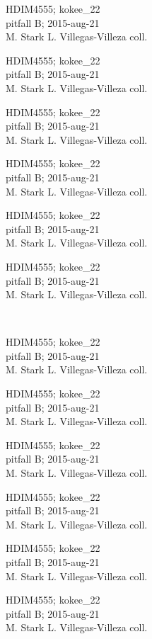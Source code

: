 \documentclass[2pt]{extarticle}
\begin{document}
\noindent
\parbox{0.16\textwidth}{\tiny \raggedright \rule[-0.3\baselineskip]{0pt}{10pt}HDIM4555; kokee\_22\\ pitfall B; 2015-aug-21\\ M. Stark L. Villegas-Villeza coll.}
\parbox{0.16\textwidth}{\tiny \raggedright \rule[-0.3\baselineskip]{0pt}{10pt}HDIM4555; kokee\_22\\ pitfall B; 2015-aug-21\\ M. Stark L. Villegas-Villeza coll.}
\parbox{0.16\textwidth}{\tiny \raggedright \rule[-0.3\baselineskip]{0pt}{10pt}HDIM4555; kokee\_22\\ pitfall B; 2015-aug-21\\ M. Stark L. Villegas-Villeza coll.}
\parbox{0.16\textwidth}{\tiny \raggedright \rule[-0.3\baselineskip]{0pt}{10pt}HDIM4555; kokee\_22\\ pitfall B; 2015-aug-21\\ M. Stark L. Villegas-Villeza coll.}
\parbox{0.16\textwidth}{\tiny \raggedright \rule[-0.3\baselineskip]{0pt}{10pt}HDIM4555; kokee\_22\\ pitfall B; 2015-aug-21\\ M. Stark L. Villegas-Villeza coll.}
\parbox{0.16\textwidth}{\tiny \raggedright \rule[-0.3\baselineskip]{0pt}{10pt}HDIM4555; kokee\_22\\ pitfall B; 2015-aug-21\\ M. Stark L. Villegas-Villeza coll.} \\ 
\vspace{0.001in} 

\noindent
\parbox{0.16\textwidth}{\tiny \raggedright \rule[-0.3\baselineskip]{0pt}{10pt}HDIM4555; kokee\_22\\ pitfall B; 2015-aug-21\\ M. Stark L. Villegas-Villeza coll.}
\parbox{0.16\textwidth}{\tiny \raggedright \rule[-0.3\baselineskip]{0pt}{10pt}HDIM4555; kokee\_22\\ pitfall B; 2015-aug-21\\ M. Stark L. Villegas-Villeza coll.}
\parbox{0.16\textwidth}{\tiny \raggedright \rule[-0.3\baselineskip]{0pt}{10pt}HDIM4555; kokee\_22\\ pitfall B; 2015-aug-21\\ M. Stark L. Villegas-Villeza coll.}
\parbox{0.16\textwidth}{\tiny \raggedright \rule[-0.3\baselineskip]{0pt}{10pt}HDIM4555; kokee\_22\\ pitfall B; 2015-aug-21\\ M. Stark L. Villegas-Villeza coll.}
\parbox{0.16\textwidth}{\tiny \raggedright \rule[-0.3\baselineskip]{0pt}{10pt}HDIM4555; kokee\_22\\ pitfall B; 2015-aug-21\\ M. Stark L. Villegas-Villeza coll.}
\parbox{0.16\textwidth}{\tiny \raggedright \rule[-0.3\baselineskip]{0pt}{10pt}HDIM4555; kokee\_22\\ pitfall B; 2015-aug-21\\ M. Stark L. Villegas-Villeza coll.} \\ 
\vspace{0.001in} 
\end{document}

